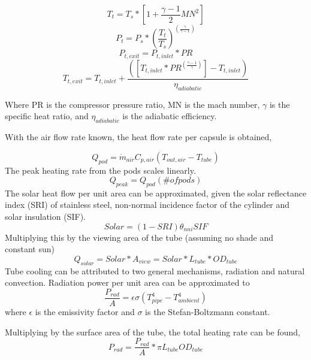 \documentclass[heading.tex]{subfiles}
\begin{document}
\begin{equation*}
T_{t} = T_{s} * [1 + \frac{\gamma -1}{2} MN^2]
\end{equation*}
\begin{equation*}
P_{t} = P_{s} * (\frac{ T_{t}}{T_{s}})^(\frac{\gamma}{\gamma -1})
\end{equation*}
\begin{equation*}
P_{t,exit} = P_{t,inlet} * PR
\end{equation*}
\begin{equation*}
T_{t,exit} = T_{t,inlet} + \frac{([T_{t,inlet}*PR^{(\frac{\gamma-1}{\gamma})}] - T_{t,inlet})}  {{\eta}_{adiabatic}}
\end{equation*}

Where PR is the compressor pressure ratio, MN is the mach number,  $\gamma$ is the specific heat ratio, and  ${\eta}_{adiabatic}$ is the
adiabatic efficiency.

With the air flow rate known, the heat flow rate per capsule is obtained,

\begin{equation*}
{Q}_{pod}= \dot{m}_{air} C_{p,air} (T_{out, air} - T_{tube})
\end{equation*}
The peak heating rate from the pods scales linearly.
\begin{equation*}
{Q}_{peak}= Q_{pod} (\# ofpods)
\end{equation*}
The solar heat flow per unit area can be approximated, given the solar reflectance index (SRI) of stainless steel, non-normal incidence factor
of the cylinder and solar insulation (SIF).
\begin{equation*}
Solar = (1-SRI) {\theta}_{nni} SIF
\end{equation*}
Multiplying this by the viewing area of the tube (assuming no shade and constant sun)
\begin{equation*}
Q_{solar} = Solar * A_{view} = Solar * L_{tube} * OD_{tube}
\end{equation*}
Tube cooling can be attributed to two general mechanisms, radiation and natural convection. Radiation power per unit area can be
approximated to
\begin{equation*}
\frac{P_{rad}}{A} = \epsilon \sigma (T_{pipe}^4 - T_{ambient}^4)
\end{equation*}
where  $\epsilon$ is the emissivity factor and  $\sigma$ is the Stefan-Boltzmann constant.

Multiplying by the surface area of the tube, the total heating rate can be found,
\begin{equation*}
P_{rad} =  \frac{P_{rad}}{A} * \pi L_{tube} OD_{tube}
\end{equation*}
\end{document}
